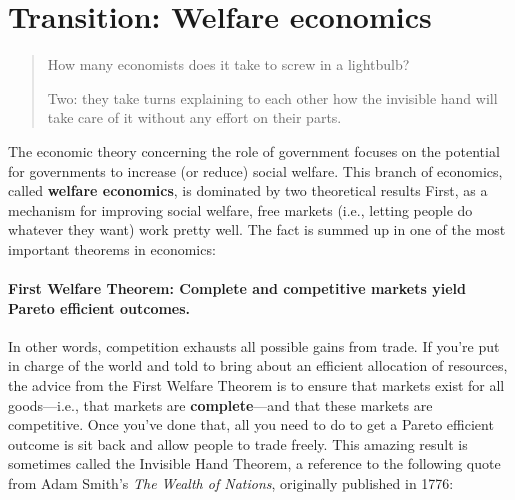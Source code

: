 \chapter{Transition: Welfare economics}
\label{3transition}


\begin{quote}

How many economists does it take to screw in a lightbulb?

Two: they take turns explaining to each other how the invisible hand will take care of it without any effort on their parts.
\end{quote}

\vspace*{.4cm}

\noindent The economic theory concerning the role of government focuses on the potential for governments to increase (or reduce) social welfare. This branch of economics, called \textbf{welfare economics}, is dominated by two theoretical results  First, as a mechanism for improving social welfare, free markets (i.e., letting people do whatever they want) work pretty well. The fact is summed up in one of the most important theorems in economics:


\subsubsection*{First Welfare Theorem: \rm Complete and competitive markets yield Pareto efficient outcomes.}

In other words, competition exhausts all possible gains from trade. If you're put in charge of the world and told to bring about an efficient allocation of resources, the advice from the First Welfare Theorem is to ensure that markets exist for all goods---i.e., that markets are \textbf{complete}---and that these markets are competitive. Once you've done that, all you need to do to get a Pareto efficient outcome is sit back and allow people to trade freely. This amazing result is sometimes called the Invisible Hand Theorem, a reference to the following quote from Adam Smith's \emph{The Wealth of Nations}, originally published in 1776:


